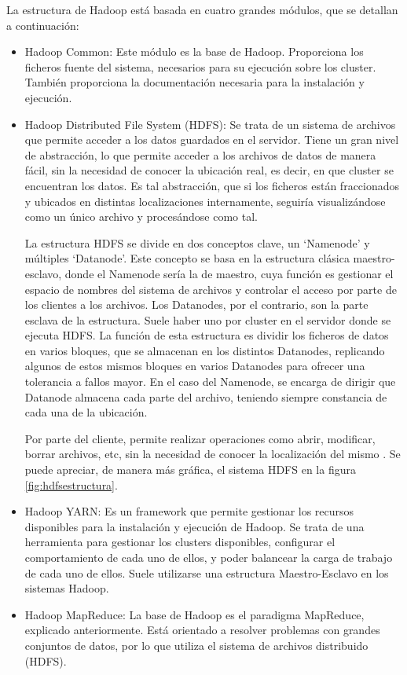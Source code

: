 La estructura de Hadoop está basada en cuatro grandes módulos, que se detallan a continuación:
\begin{itemize}
	\item Hadoop Common: Este módulo es la base de Hadoop. Proporciona los ficheros fuente del sistema, necesarios para su ejecución sobre los cluster. También proporciona la documentación necesaria para la instalación y ejecución.
	\item Hadoop Distributed File System (HDFS): Se trata de un sistema de archivos que permite acceder a los datos guardados en el servidor. Tiene un gran nivel de abstracción, lo que permite acceder a los archivos de datos de manera fácil, sin la necesidad de conocer la ubicación real, es decir, en que cluster se encuentran los datos. Es tal abstracción, que si los ficheros están fraccionados y ubicados en distintas localizaciones internamente, seguiría visualizándose como un único archivo y procesándose como tal.
	
	La estructura HDFS se divide en dos conceptos clave, un ‘Namenode’ y múltiples ‘Datanode’. Este concepto se basa en la estructura clásica maestro-esclavo, donde el Namenode sería la de maestro, cuya función es gestionar el espacio de nombres del sistema de archivos y controlar el acceso por parte de los clientes a los archivos. Los Datanodes, por el contrario, son la parte esclava de la estructura. Suele haber uno por cluster en el servidor donde se ejecuta HDFS. 
	La función de esta estructura es dividir los ficheros de datos en varios bloques, que se almacenan en los distintos Datanodes, replicando algunos de estos mismos bloques en varios Datanodes para ofrecer una tolerancia a fallos mayor. En el caso del Namenode, se encarga de dirigir que Datanode almacena cada parte del archivo, teniendo siempre constancia de cada una de la ubicación.
	
	Por parte del cliente, permite realizar operaciones como abrir, modificar, borrar archivos, etc, sin la necesidad de conocer la localización del mismo \cite{HDFSHadoopLibro}.  Se puede apreciar, de manera más gráfica, el sistema HDFS en la figura \ref{fig:hdfsestructura}.
	\item Hadoop YARN: Es un framework que permite gestionar los recursos disponibles para la instalación y ejecución de Hadoop. Se trata de una herramienta para gestionar los clusters disponibles, configurar el comportamiento de cada uno de ellos, y poder balancear la carga de trabajo de cada uno de ellos. Suele utilizarse una estructura Maestro-Esclavo en los sistemas Hadoop.
	\item Hadoop MapReduce: La base de Hadoop es el paradigma MapReduce, explicado anteriormente. Está orientado a resolver problemas con grandes conjuntos de datos, por lo que utiliza el sistema de archivos distribuido (HDFS).
\end{itemize}

